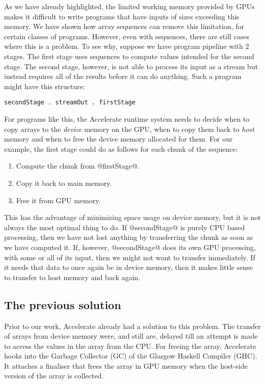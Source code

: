 As we have already highlighted, the limited working memory provided by GPUs makes it difficult to write programs that have inputs of sizes exceeding this memory. We have shown how array sequences can remove this limitation, for certain classes of programs. However, even with sequences, there are still cases where this is a problem. To see why, suppose we have program pipeline with 2 stages. The first stage uses sequences to compute values intended for the second stage. The second stage, however, is not able to process its input as a stream but instead requires all of the results before it can do anything. Such a program might have this structure:
%
\begin{lstlisting}
secondStage . streamOut . firstStage
\end{lstlisting}

For programs like this, the Accelerate runtime system needs to decide when to copy arrays to the \emph{device} memory on the GPU, when to copy them back to \emph{host} memory and when to free the device memory allocated for them. For our example, the first stage could do as follows for each chunk of the sequence:
%
\begin{enumerate}
\item Compute the chunk from @firstStage@.
\item Copy it back to main memory.
\item Free it from GPU memory.
\end{enumerate}
%
This has the advantage of minimizing space usage on device memory, but it is not always the most optimal thing to do. If @secondStage@ is purely CPU based processing, then we have not lost anything by transferring the chunk as soon as we have computed it. If, however, @secondStage@ does its own GPU processing, with some or all of its input, then we might not want to transfer immediately. If it needs that data to once again be in device memory, then it makes little sense to transfer to host memory and back again.

\subsection{The previous solution}

Prior to our work, Accelerate already had a solution to this problem. The transfer of arrays from device memory were, and still are, delayed till an attempt is made to access the values in the array from the CPU. For freeing the array, Accelerate hooks into the Garbage Collector (GC) of the Glasgow Haskell Compiler (GHC). It attaches a finaliser that frees the array in GPU memory when the host-side version of the array is collected.

